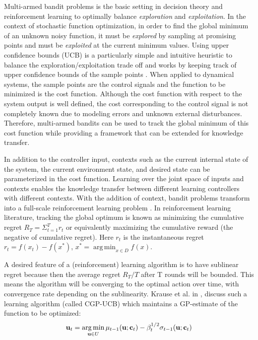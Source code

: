 Multi-armed bandit problems is the basic setting in decision theory and reinforcement learning to optimally balance \textit{exploration} and \textit{exploitation}. In the context of stochastic function optimization, in order to find the global minimum of an unknown noisy function, it must be \textit{explored} by sampling at promising points and must be \textit{exploited} at the current minimum values. Using upper confidence bounds (UCB) is a particularly simple and intuitive heuristic to balance the exploration/exploitation trade off and works by keeping track of upper confidence bounds of the sample points \cite{Krause1}. When applied to dynamical systems, the sample points are the control signals and the function to be minimized is the cost function. Although the cost function with respect to the system output is well defined, the cost corresponding to the control signal is not completely known due to modeling errors and unknown external disturbances. Therefore, multi-armed bandits can be used to track the global minimum of this cost function while providing a framework that can be extended for knowledge transfer.

In addition to the controller input, contexts such as the current internal state of the system, the current environment state, and desired state can be parameterized in the cost function. 
Learning over the joint space of inputs and contexts enables the knowledge transfer between different learning controllers with different contexts. 
With the addition of context, bandit problems transform into a full-scale reinforcement learning problem \cite{sutton98a}. In reinforcement learning literature, tracking the global optimum is known as minimizing the cumulative regret $R_{T} = \Sigma_{t = 1}^{T}r_{t} $ or equivalently maximizing the cumulative reward (the negative of cumulative regret). Here $r_{t}$ is the instantaneous regret $r_{t} = f(x_{t}) - f(x^{*})$, $x^{*} = \operatorname*{arg\,min}_{x \in \mathit{D}}f(x)$. 

A desired feature of a (reinforcement) learning algorithm is to have sublinear regret because then the average regret $R_{T}/T$ after T rounds will be bounded. This means the algorithm will be converging to the optimal action over time, with convergence rate depending on the sublinearity. Krause et al. in \cite{Krause2}, discuss such a learning algorithm (called CGP-UCB) which maintains a GP-estimate of the function to be optimized: 
\begin{equation}
\mathbf{u}_{t} = \operatorname*{arg\,min}_{\mathbf{u} \in U}\mu_{t-1}(\mathbf{u};\mathbf{c}_t) - \beta_{t}^{1/2}\sigma_{t-1}(\mathbf{u};\mathbf{c}_t) \label{ucb}
\end{equation}

